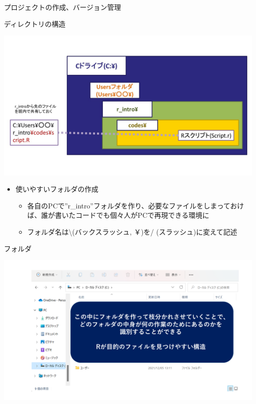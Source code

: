 \documentclass[
  ignorenonframetext,
]{beamer}
\providecommand{\tightlist}{%
  \setlength{\itemsep}{0pt}\setlength{\parskip}{0pt}}
\begin{document}
\begin{frame}{プロジェクトの作成、バージョン管理}
\begin{block}{ディレクトリの構造}
\protect\hypertarget{ux30c7ux30a3ux30ecux30afux30c8ux30eaux306eux69cbux9020}{}
\begin{center}\includegraphics[width=0.77\linewidth]{figs/folder} \end{center}

\begin{itemize}
\tightlist
\item
  使いやすいフォルダの作成

  \begin{itemize}
  \tightlist
  \item
    各自のPCで''r\_intro''フォルダを作り、必要なファイルをしまっておけば、誰が書いたコードでも個々人がPCで再現できる環境に
  \item
    フォルダ名は\textbackslash(バックスラッシュ, ￥)を/
    (スラッシュ)に変えて記述
  \end{itemize}
\end{itemize}
\end{block}

\begin{block}{フォルダ}
\protect\hypertarget{ux30d5ux30a9ux30ebux30c0}{}
\begin{center}\includegraphics[width=0.95\linewidth]{figs/directory_system} \end{center}
\end{block}


\end{frame}
\end{document}
